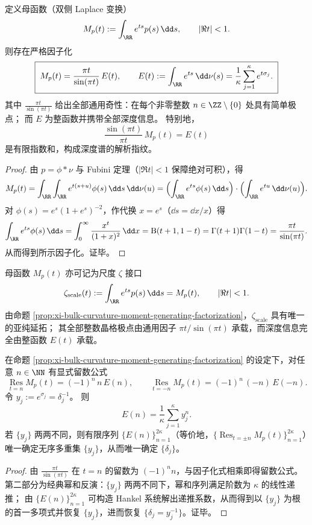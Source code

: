 \begin{proposition}\label{prop:xi-bulk-curvature-moment-generating-factorization}
定义母函数（双侧 Laplace 变换）
\[
M_p(t):=\int_{\RR}e^{ts}p(s)\,\dd s,
\qquad |\Re t|<1.
\]
则存在严格因子化
\[
\boxed{\;
M_p(t)=\frac{\pi t}{\sin(\pi t)}\,E(t),\qquad
E(t):=\int_{\RR}e^{ts}\,\dd\nu(s)=\frac{1}{\kappa}\sum_{j=1}^{\kappa}e^{t\sigma_j}.\;}
\]
其中 \(\frac{\pi t}{\sin(\pi t)}\) 给出全部通用奇性：在每个非零整数 \(n\in\ZZ\setminus\{0\}\) 处具有简单极点；
而 \(E\) 为整函数并携带全部深度信息。
特别地，
\[
\boxed{\;\frac{\sin(\pi t)}{\pi t}\,M_p(t)=E(t)\;}
\]
是有限指数和，构成深度谱的解析指纹。
\end{proposition}
\begin{proof}
由 \(p=\phi*\nu\) 与 Fubini 定理（\(|\Re t|<1\) 保障绝对可积），得
\[
M_p(t)=\int_{\RR}\int_{\RR}e^{t(s+u)}\phi(s)\,\dd s\,\dd\nu(u)
=\Bigl(\int_{\RR}e^{ts}\phi(s)\,\dd s\Bigr)\cdot\Bigl(\int_{\RR}e^{tu}\,\dd\nu(u)\Bigr).
\]
对 \(\phi(s)=e^{s}(1+e^{s})^{-2}\)，作代换 \(x=e^{s}\)（\(\dd s=\dd x/x\)）得
\[
\int_{\RR}e^{ts}\phi(s)\,\dd s
=\int_{0}^{\infty}\frac{x^{t}}{(1+x)^{2}}\,\dd x
=\mathrm{B}(t+1,1-t)
=\Gamma(t+1)\Gamma(1-t)
=\frac{\pi t}{\sin(\pi t)}.
\]
从而得到所示因子化。证毕。
\end{proof}

\begin{remark}\label{rem:xi-bulk-curvature-scale-zeta-notation}
母函数 \(M_p(t)\) 亦可记为尺度 \(\zeta\) 接口
\[
\zeta_{\mathrm{scale}}(t):=\int_{\RR}e^{ts}p(s)\,\dd s=M_p(t),
\qquad
|\Re t|<1.
\]
由命题 \ref{prop:xi-bulk-curvature-moment-generating-factorization}，\(\zeta_{\mathrm{scale}}\) 具有唯一的亚纯延拓；
其全部整数晶格极点由通用因子 \(\pi t/\sin(\pi t)\) 承载，而深度信息完全由整函数 \(E(t)\) 承载。
\end{remark}

\begin{corollary}\label{cor:xi-bulk-curvature-residue-dirichlet-data}
在命题 \ref{prop:xi-bulk-curvature-moment-generating-factorization} 的设定下，对任意 \(n\in\NN\) 有显式留数公式
\[
\boxed{\;
\operatorname*{Res}_{t=n}M_p(t)=(-1)^n\,n\,E(n),\qquad
\operatorname*{Res}_{t=-n}M_p(t)=(-1)^n\,(-n)\,E(-n).\;}
\]
令 \(y_j:=e^{\sigma_j}=\delta_j^{-1}\)。
则
\[
E(n)=\frac{1}{\kappa}\sum_{j=1}^{\kappa}y_j^{n}.
\]
若 \(\{y_j\}\) 两两不同，则有限序列 \(\{E(n)\}_{n=1}^{2\kappa}\)（等价地，\(\{\operatorname*{Res}_{t=\pm n}M_p(t)\}_{n=1}^{2\kappa}\)）唯一确定无序多重集 \(\{y_j\}\)，从而唯一确定 \(\{\delta_j\}\)。
\end{corollary}
\begin{proof}
由
\(
\frac{\pi t}{\sin(\pi t)}
\)
在 \(t=n\) 的留数为 \((-1)^n n\)，与因子化式相乘即得留数公式。
第二部分为经典幂和反演：\(\{y_j\}\) 两两不同下，幂和序列满足阶数为 \(\kappa\) 的线性递推；
由 \(\{E(n)\}_{n=1}^{2\kappa}\) 可构造 Hankel 系统解出递推系数，从而得到以 \(\{y_j\}\) 为根的首一多项式并恢复 \(\{y_j\}\)，进而恢复 \(\{\delta_j=y_j^{-1}\}\)。证毕。
\end{proof}


